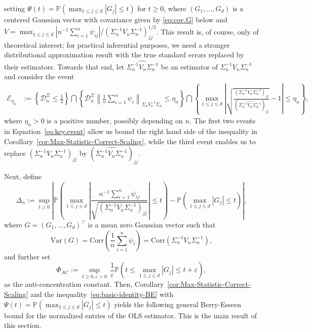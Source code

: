 \documentclass[11pt]{article}
\begin{document}
 setting $\Psi(t) = \mathbb{P}(\max_{1\le j\le d}|G_j| \le t)$ for $t\ge0$,  where $(G_1,\ldots,G_d)$ is a centered Gaussian vector with covariance given by \eqref{eq:cov.G} below and $V = \max_{1\le j\le d}|{ n^{-1}\sum_{i=1}^n \psi_{ij}}|/{(\Sigma_n^{-1}V_n\Sigma_n^{-1})_{jj}^{1/2}}$.
 This result is, of course, only of theoretical interest;  for practical inferential purposes, we need a stronger distributional approximation result with the true standard errors replaced by their estimators. Towards that end, let $\widehat{\Sigma_n^{-1}V_n\Sigma_n^{-1}}$ be an estimator of $\Sigma_n^{-1}V_n\Sigma_n^{-1}$ and consider the event
\begin{equation}\label{eq:key.event}
\begin{split}
\mathcal{E}_{\eta_n} &:= \left\{\mathcal{D}_n^{\Sigma} \le
\frac{1}{2}\right\} \bigcap
\left\{\mathcal{D}_n^{\Sigma}\left\|\frac{1}{n}\sum_{i=1}^n
\psi_i\right\|_{\Sigma_n V^{-1}_n\Sigma_n} \le
\eta_n\right\}
\bigcap\left\{\max_{1\le j\le   d}
\left|\sqrt{\frac{(\Sigma_n^{-1}V_n\Sigma_n^{-1})_{jj}}{(\widehat{\Sigma_n^{-1}V_n\Sigma_n^{-1}})_{jj}}}- 1\right| \le \eta_n\right\},
\end{split}
\end{equation}
where $\eta_n>0$ is a positive number, possibly depending on $n$.
The first two  events in Equation~\eqref{eq:key.event} allow us bound the right hand side of the inequality in Corollary~\ref{cor:Max-Statistic-Correct-Scaling}, while the third event enables us to replace $(\Sigma_n^{-1}V_n\Sigma_n^{-1})_{jj}$ by $(\widehat{\Sigma_n^{-1}V_n\Sigma_n^{-1}})_{jj}$. 

Next, define
\[
\Delta_n := \sup_{t\ge0}\left|\mathbb{P}\left(\max_{1\le j\le d}\left|\frac{n^{-1}\sum_{i=1}^n\psi_{ij}}{\sqrt{(\Sigma_n^{-1}V_n\Sigma_n^{-1})_{jj}}}\right| \le t\right) - \mathbb{P}\left(\max_{1\le j\le d}|G_j| \le t\right)\right|,
\]
where $G = (G_1,\ldots,G_d)^{\top}$ is a mean zero Gaussian vector such that
\begin{equation}\label{eq:cov.G}
\mbox{Var}(G) = \mbox{Corr}\left( \frac{1}{n} \sum_{i=1}^n \psi_i \right) = \mbox{Corr}\left( \Sigma_n^{-1}V_n\Sigma_n^{-1}  \right),
\end{equation}
 and further set
\[
\Phi_{AC} := \sup_{t\ge0,\varepsilon>0}\,\frac{1}{\varepsilon}\mathbb{P}\left(t \le \max_{1\le j\le d}|G_j| \le t+\varepsilon\right),
\]
as the anti-concentration constant.
Then, Corollary~\ref{cor:Max-Statistic-Correct-Scaling} and the inequality~\eqref{eq:basic-identity-BE} with $\Psi(t) = \mathbb{P}(\max_{1\le j\le d}|G_j| \le t)$ yields
the following general Berry-Esseen bound for the normalized entries of the OLS estimator. This is the main result of this section. 
\end{document}
